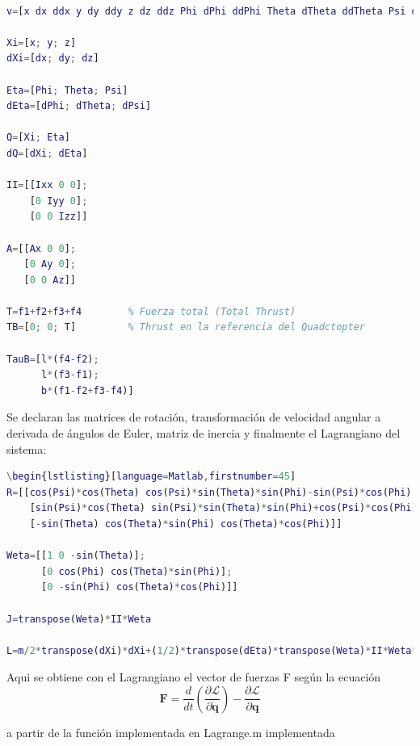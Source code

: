 \documentclass[twoside,11pt]{book}
\begin{document}
\begin{lstlisting}[language=Matlab,firstnumber=18]
% El vector de variables que se usaran

v=[x dx ddx y dy ddy z dz ddz Phi dPhi ddPhi Theta dTheta ddTheta Psi dPsi ddPsi]

Xi=[x; y; z]
dXi=[dx; dy; dz]

Eta=[Phi; Theta; Psi]
dEta=[dPhi; dTheta; dPsi]

Q=[Xi; Eta]
dQ=[dXi; dEta]

II=[[Ixx 0 0];
    [0 Iyy 0];
    [0 0 Izz]]

A=[[Ax 0 0];
   [0 Ay 0];
   [0 0 Az]]   
   
T=f1+f2+f3+f4        % Fuerza total (Total Thrust)
TB=[0; 0; T]         % Thrust en la referencia del Quadctopter

TauB=[l*(f4-f2);
      l*(f3-f1);
      b*(f1-f2+f3-f4)]   
\end{lstlisting}
\onehalfspacing
Se declaran las matrices de rotación, transformación de velocidad angular a derivada de ángulos de Euler, matriz de inercia y finalmente el Lagrangiano del sistema:
\singlespacing
\begin{lstlisting}[language=Matlab,firstnumber=45]
\begin{lstlisting}[language=Matlab,firstnumber=45]   
R=[[cos(Psi)*cos(Theta) cos(Psi)*sin(Theta)*sin(Phi)-sin(Psi)*cos(Phi) cos(Psi)*sin(Theta)*cos(Phi)+sin(Psi)*sin(Phi)];
    [sin(Psi)*cos(Theta) sin(Psi)*sin(Theta)*sin(Phi)+cos(Psi)*cos(Phi) sin(Psi)*sin(Theta)*cos(Phi)-cos(Psi)*sin(Phi)];
    [-sin(Theta) cos(Theta)*sin(Phi) cos(Theta)*cos(Phi)]]

Weta=[[1 0 -sin(Theta)];
      [0 cos(Phi) cos(Theta)*sin(Phi)];
      [0 -sin(Phi) cos(Theta)*cos(Phi)]]
  
J=transpose(Weta)*II*Weta  
  
L=m/2*transpose(dXi)*dXi+(1/2)*transpose(dEta)*transpose(Weta)*II*Weta*dEta-m*g*z
\end{lstlisting}
\onehalfspacing
Aqui se obtiene con el Lagrangiano el vector de fuerzas F según la ecuación 
\begin{equation}
\mathbf{F}=\frac{d}{dt}\left( \frac{\partial \mathcal{L}}{\partial \dot{\pmb{q}}} \right) - \frac{\partial \mathcal{L}}{\partial \pmb{q}}
\end{equation}

a partir de la función implementada en Lagrange.m implementada \cite{Lagrangian_Matlab} \\
\end{document}
